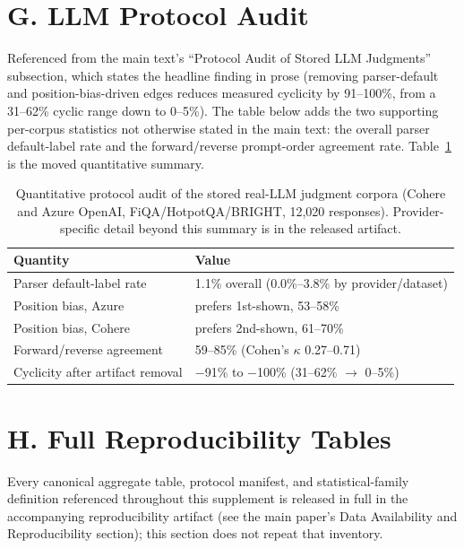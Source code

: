 \documentclass[manuscript,anonymous,review]{acmart}
\begin{document}
\section{G. LLM Protocol Audit}
\label{sec:supp-llm}

Referenced from the main text's ``Protocol Audit of Stored LLM Judgments''
subsection, which states the headline finding in prose (removing
parser-default and position-bias-driven edges reduces measured cyclicity by
91--100\%, from a 31--62\% cyclic range down to 0--5\%). The table below adds
the two supporting per-corpus statistics not otherwise stated in the main
text: the overall parser default-label rate and the forward/reverse
prompt-order agreement rate. Table~\ref{tab:supp-llm-audit} is the moved
quantitative summary.

\begin{table}[h]
  \caption{Quantitative protocol audit of the stored real-LLM judgment
    corpora (Cohere and Azure OpenAI, FiQA/HotpotQA/BRIGHT, 12{,}020
    responses). Provider-specific detail beyond this summary is in the
    released artifact.}
  \label{tab:supp-llm-audit}
  \begin{tabular}{ll}
    \toprule
    Quantity & Value \\
    \midrule
    Parser default-label rate & 1.1\% overall (0.0\%--3.8\% by provider/dataset) \\
    Position bias, Azure & prefers 1st-shown, 53--58\% \\
    Position bias, Cohere & prefers 2nd-shown, 61--70\% \\
    Forward/reverse agreement & 59--85\% (Cohen's $\kappa$ 0.27--0.71) \\
    Cyclicity after artifact removal & $-$91\% to $-$100\% (31--62\% $\to$ 0--5\%) \\
    \bottomrule
  \end{tabular}
\end{table}

\section{H. Full Reproducibility Tables}
\label{sec:supp-reproducibility}

Every canonical aggregate table, protocol manifest, and statistical-family
definition referenced throughout this supplement is released in full in the
accompanying reproducibility artifact (see the main paper's Data Availability
and Reproducibility section); this section does not repeat that inventory.



\end{document}
